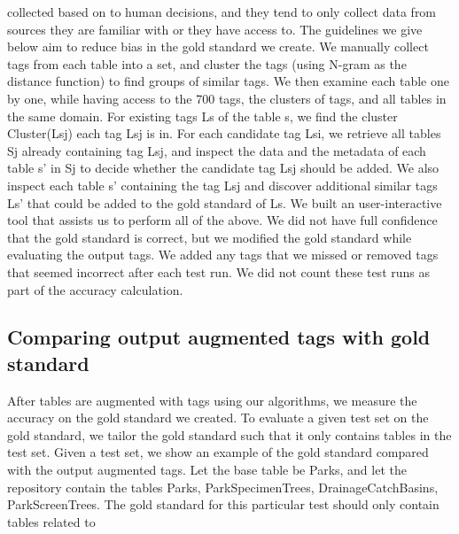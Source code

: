 collected based on to human decisions, and they tend to only collect data from sources they are familiar with or they have access to.
The guidelines we give below aim to reduce bias in the gold standard we create. We manually collect tags from each table into a set, and cluster the tags (using N-gram as the distance function) to find groups of similar tags. We then examine each table one by one, while having access to the 700 tags, the clusters of tags, and all tables in the same domain. For existing tags Ls of the table s, we find the cluster Cluster(Lsj) each tag Lsj is in. For each candidate tag Lsi, we retrieve all tables Sj already containing tag Lsj, and inspect the data and the metadata of each table s' in Sj to decide whether the candidate tag Lsj should be added. We also inspect each table s' containing the tag Lsj and discover additional similar tags Ls' that could be added to the gold standard of Ls. We built an user-interactive tool that assists us to perform all of the above. We did not have full confidence that the gold standard is correct, but we modified the gold standard while evaluating the output tags. We added any tags that we missed or removed tags that seemed incorrect after each test run. We did not count these test runs as part of the accuracy calculation.

\subsection{Comparing output augmented tags with gold standard}
\label{ssec:ComparingOutputAugmentedTagsWithGoldStandard}

After tables are augmented with tags using our algorithms, we measure the accuracy on the gold standard we created. To evaluate a given test set on the gold standard, we tailor the gold standard such that it only contains tables in the test set. Given a test set, we show an example of the gold standard compared with the output augmented tags. Let the base table be Parks, and let the repository contain the tables {Parks, ParkSpecimenTrees, DrainageCatchBasins, ParkScreenTrees}. The gold standard for this particular test should only contain tables related to

